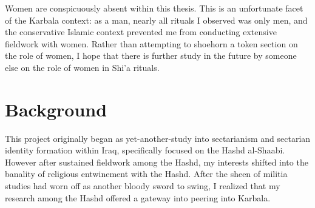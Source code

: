 Women are conspicuously absent within this thesis. This is an unfortunate facet of the Karbala context: as a man, nearly all rituals I observed was only men, and the conservative Islamic context prevented me from conducting extensive fieldwork with women. Rather than attempting to shoehorn a token section on the role of women, I hope that there is further study in the future by someone else on the role of women in Shi'a rituals. 





\section{Background}
This project originally began as yet-another-study into sectarianism and sectarian identity formation within Iraq, specifically focused on the Hashd al-Shaabi. However after sustained fieldwork among the Hashd, my interests shifted into the banality of religious entwinement with the Hashd. After the sheen of militia studies had worn off as another bloody sword to swing, I realized that my research among the Hashd offered a gateway into peering into Karbala. 


